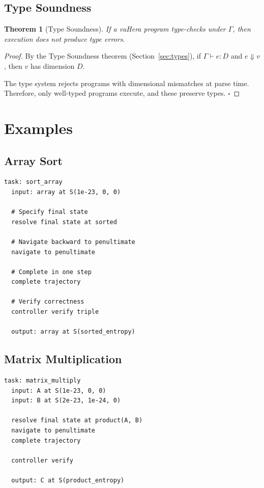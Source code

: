 \documentclass[twocolumn,10pt]{article}
\newtheorem{theorem}{Theorem}[section]
\theoremstyle{definition}
\theoremstyle{remark}
\begin{document}
\subsection{Type Soundness}

\begin{theorem}[Type Soundness]
If a vaHera program type-checks under $\Gamma$, then execution does not produce type errors.
\end{theorem}

\begin{proof}
By the Type Soundness theorem (Section~\ref{sec:types}), if $\Gamma \vdash e : D$ and $e \Downarrow v$, then $v$ has dimension $D$.

The type system rejects programs with dimensional mismatches at parse time. Therefore, only well-typed programs execute, and these preserve types. $\square$
\end{proof}

\section{Examples}
\label{sec:examples}

\subsection{Array Sort}

\begin{lstlisting}[caption={Array sort via trajectory completion}]
task: sort_array
  input: array at S(1e-23, 0, 0)

  # Specify final state
  resolve final state at sorted

  # Navigate backward to penultimate
  navigate to penultimate

  # Complete in one step
  complete trajectory

  # Verify correctness
  controller verify triple

  output: array at S(sorted_entropy)
\end{lstlisting}

\subsection{Matrix Multiplication}

\begin{lstlisting}[caption={Matrix multiplication}]
task: matrix_multiply
  input: A at S(1e-23, 0, 0)
  input: B at S(2e-23, 1e-24, 0)

  resolve final state at product(A, B)
  navigate to penultimate
  complete trajectory

  controller verify

  output: C at S(product_entropy)
\end{lstlisting}
\end{document}

